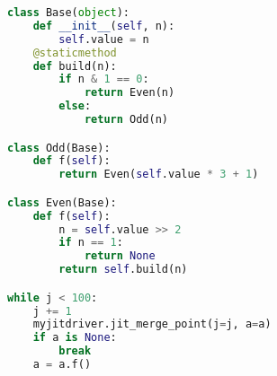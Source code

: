 \begin{lstlisting}[language=Python]
class Base(object):
    def __init__(self, n):
        self.value = n
    @staticmethod
    def build(n):
        if n & 1 == 0:
            return Even(n)
        else:
            return Odd(n)

class Odd(Base):
    def f(self):
        return Even(self.value * 3 + 1)

class Even(Base):
    def f(self):
        n = self.value >> 2
        if n == 1:
            return None
        return self.build(n)

while j < 100:
    j += 1
    myjitdriver.jit_merge_point(j=j, a=a)
    if a is None:
        break
    a = a.f()
\end{lstlisting}
